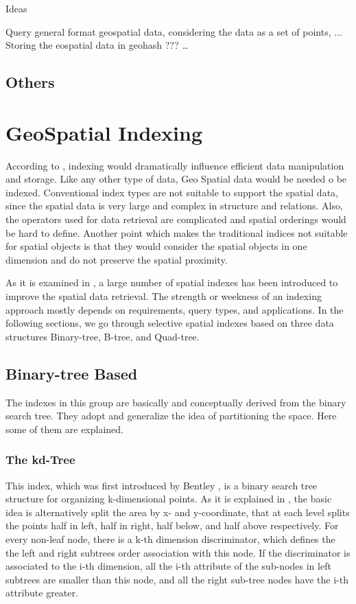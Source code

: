 \documentclass[a4paper,12pt]{article}
\begin{document}
Ideas

Query general format geospatial data, considering the data as a set of points, ...
Storing the eospatial data in geohash ???
…


\subsection{Others}
\newpage















\section{GeoSpatial Indexing}
According to \cite{survey}, indexing would dramatically influence efficient data manipulation and storage. Like any other type of data, Geo Spatial data would be needed o be indexed. Conventional index types are not suitable to support the spatial data, since the spatial data is very large and complex in structure and relations. Also, the operators used for data retrieval are complicated and spatial orderings would be hard to define. Another point which makes the traditional indices not suitable for spatial objects is that they would consider the spatial objects in one dimension and do not preserve the spatial proximity.

As it is examined in \cite{survey}, a large number of spatial indexes has been introduced to improve the spatial data retrieval.
The strength or weekness of an indexing approach mostly depends on requirements, query types, and applications. In the following sections, we go through selective spatial indexes based on three data structures Binary-tree, B-tree, and Quad-tree.

\subsection{Binary-tree Based}
The indexes in this group are basically and conceptually derived from the binary search tree. They adopt and generalize the idea of partitioning the space. Here some of them are explained.

\subsubsection{The kd-Tree}
This index, which was first introduced by Bentley \cite{bently1975}, is a binary search tree structure for organizing k-dimensional points. As it is explained in \cite{bently1975}, the basic idea is alternatively split the area by x- and y-coordinate, that at each level splits the points half in left, half in right, half below, and half above respectively. For every non-leaf node, there is a k-th dimension discriminator, which defines the the left and right subtrees order association with this node. If the discriminator is associated to the i-th dimension, all the i-th attribute of the sub-nodes in left subtrees are smaller than this node, and all the right sub-tree nodes have the i-th attribute greater.
\end{document}

